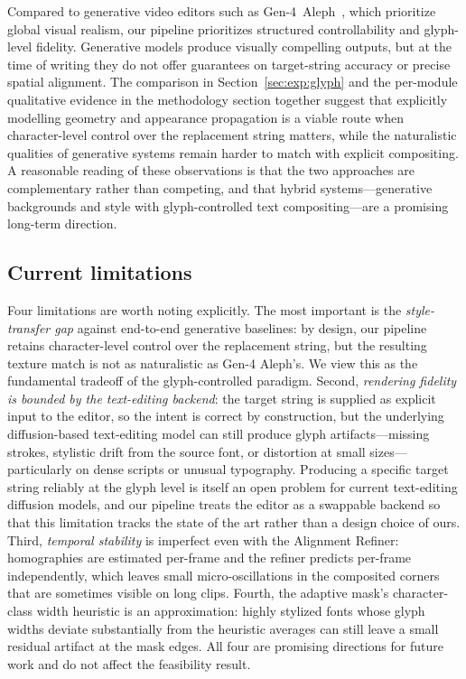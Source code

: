 Compared to generative video editors such as
Gen-4~Aleph~\citep{runway2025aleph}, which prioritize global
visual realism, our pipeline prioritizes structured
controllability and glyph-level fidelity. Generative models
produce visually compelling outputs, but at the time of writing
they do not offer guarantees on target-string accuracy or precise
spatial alignment. The comparison in
Section~\ref{sec:exp:glyph} and the per-module qualitative
evidence in the methodology section together suggest that
explicitly modelling geometry and appearance propagation is a
viable route when character-level control over the replacement
string matters, while the naturalistic qualities of generative
systems remain harder to match with explicit compositing. A
reasonable reading of these observations is that
the two approaches are complementary rather than competing, and
that hybrid systems---generative backgrounds and style with
glyph-controlled text compositing---are a promising long-term
direction.

\subsection{Current limitations}
\label{sec:exp:limits}

Four limitations are worth noting explicitly. The most important
is the \emph{style-transfer gap} against end-to-end generative
baselines: by design, our pipeline retains character-level control
over the replacement string, but the resulting texture match is
not as naturalistic as Gen-4 Aleph's. We view this as the
fundamental tradeoff of the glyph-controlled paradigm. Second,
\emph{rendering fidelity is bounded by the text-editing backend}:
the target string is supplied as explicit input to the editor, so
the intent is correct by construction, but the underlying
diffusion-based text-editing model can still produce glyph
artifacts---missing strokes, stylistic drift from the source
font, or distortion at small sizes---particularly on dense
scripts or unusual typography. Producing a specific target string
reliably at the glyph level is itself an open problem for current
text-editing diffusion models, and our pipeline treats the editor
as a swappable backend so that this limitation tracks the state of
the art rather than a design choice of ours. Third,
\emph{temporal stability} is imperfect even with the Alignment
Refiner: homographies are estimated per-frame and the refiner
predicts per-frame independently, which leaves small
micro-oscillations in the composited corners that are sometimes
visible on long clips. Fourth, the adaptive mask's character-class
width heuristic is an approximation: highly stylized fonts whose
glyph widths deviate substantially from the heuristic averages can
still leave a small residual artifact at the mask edges. All four
are promising directions for future work and do not affect the
feasibility result.

